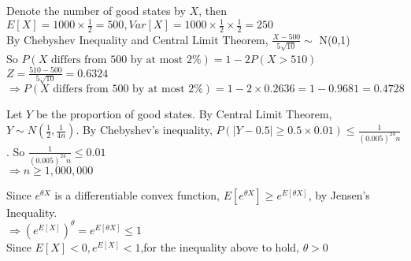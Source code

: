 \documentclass[12pt]{article}
\newenvironment{problem}[2][Problem]{\begin{trivlist}
\item[\hskip \labelsep {\bfseries #1}\hskip \labelsep {\bfseries #2.}]}{\end{trivlist}}
\begin{document}
\begin{problem}{9(a)}\hfill\linebreak
Denote the number of good states by $X$, then
$E[X]=1000\times \frac{1}{2}=500, Var[X]=1000\times \frac{1}{2}\times \frac{1}{2}=250$\\
By Chebyshev Inequality and Central Limit Theorem, $\frac{X-500}{5\sqrt{10}}\sim$ N(0,1)\\
So $P(X\text{ differs from 500 by at most }2\%)=1-2P(X>510)$\\
$Z=\frac{510-500}{5\sqrt{10}}=0.6324$\\
$\Rightarrow P(X\text{ differs from 500 by at most }2\%)=1-2\times 0.2636=1-0.9681=0.4728$
\end{problem}

\begin{problem}{9(b)}\hfill\linebreak
Let $Y$ be the proportion of good states. By Central Limit Theorem, $Y\sim N(\frac{1}{2},\frac{1}{4n})$. By Chebyshev's inequality, $P(|Y-0.5|\geq 0.5\times 0.01)\leq \frac{1}{(0.005)^24n}$. So $\frac{1}{(0.005)^24n}\leq 0.01$\\
$\Rightarrow n\geq 1,000,000$
\end{problem}

\begin{problem}{10}\hfill\linebreak
Since $e^{\theta X}$ is a differentiable convex function, $E[e^{\theta X}]\geq e^{E[\theta X]}$, by Jensen's Inequality. \\
$\Rightarrow (e^{E[X]})^\theta=e^{E[\theta X]}\leq 1$\\
Since $E[X]<0, e^{E[X]}<1$,for the inequality above to hold, $\theta>0$
\end{problem}
\end{document}
